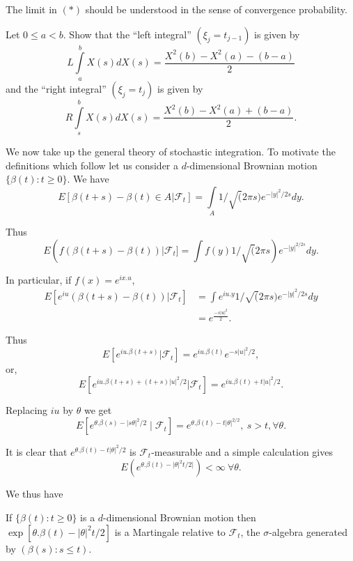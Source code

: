 \begin{remark*}
The limit in $(*)$ should be understood in the sense of convergence
probability. 
\end{remark*}

\begin{exercise}\label{chap11-exer3}
Let $0\leq a<b$. Show that the ``left integral'' $(\xi_{j}=t_{j-1})$
is given by
$$
L\int\limits^{b}_{a}X(s)dX(s)=\frac{X^{2}(b)-X^{2}(a)-(b-a)}{2}
$$
and the ``right integral'' $(\xi_{j}=t_{j})$ is given by
$$
R\int\limits^{b}_{s}X(s)dX(s)=\frac{X^{2}(b)-X^{2}(a)+(b-a)}{2}.
$$

We now take up the general theory of stochastic integration. To
motivate the definitions which follow let us consider a
$d$-dimensional Brownian motion $\{\beta(t):t\geq 0\}$. We have
$$
E[\beta(t+s)-\beta(t)\in
  A|\mathscr{F}_{t}]=\int\limits_{A}1/\surd(2\pi s)e^{-|y|^{2}/2s}dy.
$$

Thus
$$
E(f(\beta(t+s)-\beta(t))|\mathscr{F}_{t}]=\int f(y)1/\surd(2\pi
s)e^{-|y|^{2/2s}}dy. 
$$

In particular, if $f(x)=e^{ix.u}$,
\begin{align*}
E[e^{iu}(\beta(t+s)-\beta(t))|\mathscr{F}_{t}] &= \int e^{iu.y}1/\surd
(2\pi s)e^{-|y|^{2}/2s}dy\\
&= e^{\frac{-s|u|^{2}}{2}}.
\end{align*}

Thus\pageoriginale
$$
E[e^{iu.\beta(t+s)}|\mathscr{F}_{t}]=e^{iu.\beta(t)}e^{-s|u|^{2}/2},
$$
or,
$$
E[e^{iu.\beta(t+s)+(t+s)|u|^{2}/2}|\mathscr{F}_{t}]=e^{iu.\beta(t)+t|u|^{2}/2}.
$$

Replacing $iu$ by $\theta$ we get
$$
E[e^{\theta.\beta(s)-|s\theta|^{2}/2}\mid\mathscr{F}_{t}]=e^{\theta.\beta(t)-t|\theta|^{2/2}},
\ s>t, \forall \theta. 
$$

It is clear that $e^{\theta.\beta(t)-t|\theta|^{2}/2}$ is
$\mathscr{F}_{t}$-measurable and a simple calculation gives
$$
E(e^{\theta.\beta(t)-|\theta|^{2}t/2|})<\infty \ \forall \theta.
$$
\end{exercise}

We thus have

\begin{theorem*}
If $\{\beta(t):t\geq 0\}$ is a $d$-dimensional Brownian motion then
$\exp [\theta.\beta(t)-|\theta|^{2}t/2]$ is a Martingale relative to
$\mathscr{F}_{t}$, the $\sigma$-algebra generated by $(\beta(s):s\leq t)$.
\end{theorem*}

